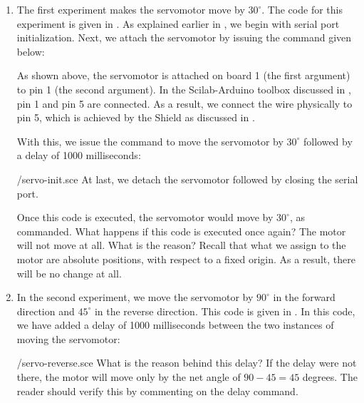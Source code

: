 \begin{enumerate}
  \item The first experiment makes the servomotor move by $30^\circ$. The code for this experiment is
        given in . As explained earlier in , 
        we begin with serial port initialization.
        Next, we attach the servomotor by issuing the command given below:
        
        As shown above, the servomotor is attached on board 1 (the first argument)
        to pin 1 (the second argument).  In the Scilab-Arduino toolbox discussed 
        in , pin 1 and pin 5 are connected. As a result, we connect the wire physically to
        pin 5, which is achieved by the Shield as discussed in .
        
        With this, we issue the command to move the servomotor by $30^\circ$ followed by a delay of 
        1000 milliseconds:
        
        {\LocSERscicode/servo-init.sce}
        At last, we  detach the servomotor followed by closing the serial port. 
        
        Once this code is executed, the servomotor would move by
        $30^\circ$, as commanded.  What happens if this code is executed
        once again?  The motor will not move at all.  What is the reason?
        Recall that what we assign to the motor are absolute positions, with
        respect to a fixed origin.  As a result, there will be no change at
        all. 
        
  \item In the second experiment, we move the servomotor by $90^\circ$ in the
        forward direction and $45^\circ$ in the reverse direction.  This
        code is given in .  In this code, 
        we have added a delay of 1000 milliseconds between the two instances of 
        moving the servomotor: 
        
        {\LocSERscicode/servo-reverse.sce}
        What is the reason behind this delay?  If the delay were not
        there, the motor will move only by the net angle of $90-45 = 45$
        degrees.  The reader should verify this by commenting on the delay
        command. 
        

\end{enumerate}
